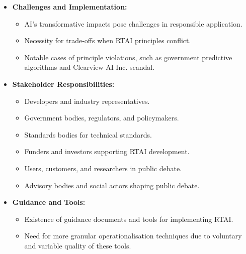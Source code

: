 \begin{itemize}
    \item \textbf{Challenges and Implementation:}
    \begin{itemize}
        \item AI's transformative impacts pose challenges in responsible application.
        \item Necessity for trade-offs when RTAI principles conflict.
        \item Notable cases of principle violations, such as government predictive algorithms and Clearview AI Inc. scandal.
    \end{itemize}

    \item \textbf{Stakeholder Responsibilities:}
    \begin{itemize}
        \item Developers and industry representatives.
        \item Government bodies, regulators, and policymakers.
        \item Standards bodies for technical standards.
        \item Funders and investors supporting RTAI development.
        \item Users, customers, and researchers in public debate.
        \item Advisory bodies and social actors shaping public debate.
    \end{itemize}

    \item \textbf{Guidance and Tools:}
    \begin{itemize}
        \item Existence of guidance documents and tools for implementing RTAI.
        \item Need for more granular operationalisation techniques due to voluntary and variable quality of these tools.
    \end{itemize}
\end{itemize}


